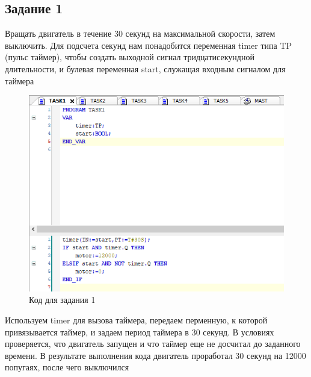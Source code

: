 \documentclass[a4paper, 16pt]{article}
\begin{document}
    \subsection{Задание 1}
    \noindent Вращать двигатель в течение 30 секунд на максимальной скорости, затем выключить.
    Для подсчета секунд нам понадобится переменная timer типа TP (пульс таймер), чтобы создать выходной
    сигнал тридцатисекундной длительности, и булевая переменная start, служащая входным сигналом для таймера
    \begin{figure}[h!]
        \centering
        \includegraphics[scale=0.8]{t1.png}
        \captionsetup{skip=0pt}
        \caption{Код для задания 1}
        \label{Рис:4}
    \end{figure}


    \noindent Используем timer для вызова таймера, передаем перменную, к которой привязывается таймер, и
    задаем период таймера в 30 секунд. В условиях проверяется, что двигатель запущен и что таймер еще не досчитал
    до заданного времени. В результате выполнения кода двигатель проработал 30 секунд на 12000
    попугаях, после чего выключился


    \newpage
\end{document}

